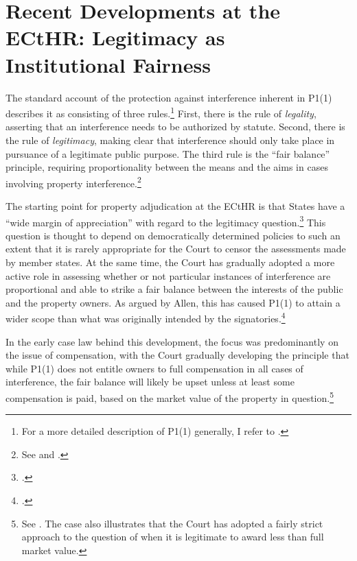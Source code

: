 \section{Recent Developments at the ECtHR: Legitimacy as Institutional Fairness}\label{sec:echr}

The standard account of the protection against interference inherent in P1(1) describes it as consisting of three rules.\footnote{For a more detailed description of P1(1) generally, I refer to \cite{allen05}.} First, there is the rule of {\it legality}, asserting that an interference needs to be authorized by statute. Second, there is the rule of {\it legitimacy}, making clear that interference should only take place in pursuance of a legitimate public purpose. The third rule is the ``fair balance'' principle, requiring proportionality between the means and the aims in cases involving property interference.\footnote{See \cite[69]{sporrong82} and \cite[120]{james86}.} %

The starting point for property adjudication at the ECtHR is that States have a ``wide margin of appreciation'' with regard to the legitimacy question.\footcite[See][54]{james86} This question is thought to depend on democratically determined policies to such an extent that it is rarely appropriate for the Court to censor the assessments made by member states. At the same time, the Court has gradually adopted a more active role in assessing whether or not particular instances of interference are proportional and able to strike a fair balance between the interests of the public and the property owners. As argued by Allen, this has caused P1(1) to attain a wider scope than what was originally intended by the signatories.\footcite[1055]{allen10}

In the early case law behind this development, the focus was predominantly on the issue of compensation, with the Court gradually developing the principle that while P1(1) does not entitle owners to full compensation in all cases of interference, the fair balance will likely be upset unless at least some compensation is paid, based on the market value of the property in question.\footnote{See \cite[103]{scordino06}. The case also illustrates that the Court has adopted a fairly strict approach to the question of when it is legitimate to award less than full market value.} %

